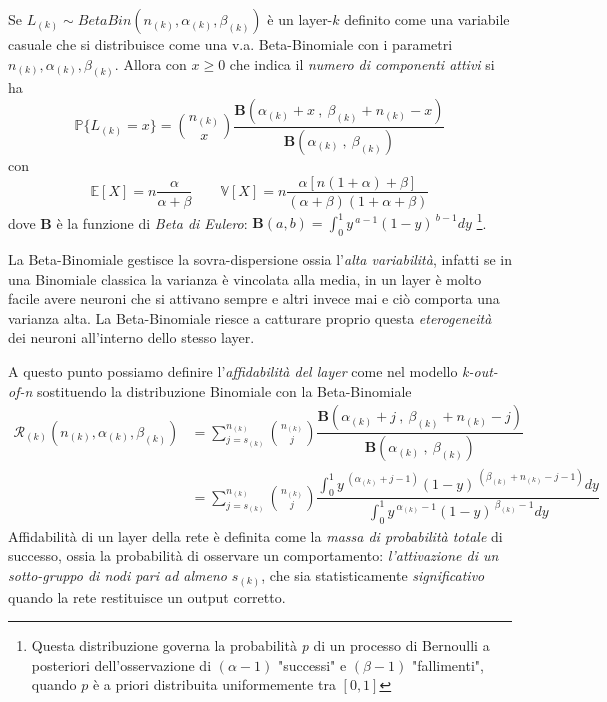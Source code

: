 \documentclass[10pt]{article} %
\begin{document}
Se $L_{(k)}\sim BetaBin(n_{(k)},\alpha_{(k)},\beta_{(k)})$ è un layer-$k$ definito come una variabile casuale che si distribuisce come una v.a. Beta-Binomiale con i parametri $n_{(k)},\alpha_{(k)},\beta_{(k)}$. Allora con $x \ge 0$ che indica il \textit{numero di componenti attivi} si ha
\begin{equation}\label{BetaBin}
    \mathbb{P}\{L_{(k)} = x\} = \binom{n_{(k)}}{x}\dfrac{\textbf{B}(\alpha_{(k)}+x\ ,\ \beta_{(k)}+n_{(k)}-x)}{\textbf{B}(\alpha_{(k)}\ ,\ \beta_{(k)})}
\end{equation}
con
\begin{equation}
    \mathbb{E}[X] = n\dfrac{\alpha}{\alpha+\beta} \qquad 
    \mathbb{V}[X] = n\dfrac{\alpha[n(1+\alpha)+\beta]}{(\alpha+\beta)(1+\alpha+\beta)}
\end{equation}
dove \textbf{B} è la funzione di \textit{Beta di Eulero}:
$\textbf{B}(a, b) = \int_{0}^{1} y^{\ a-1}(1-y)^{\ b-1} dy$ \footnote{Questa distribuzione governa la probabilità 
\textit{p} di un processo di Bernoulli a posteriori dell'osservazione di $(\alpha-1)$ "successi" e $(\beta-1)$ "fallimenti", quando $p$ è a priori distribuita uniformemente tra $[0,1]$}.

La Beta-Binomiale gestisce la sovra-dispersione ossia l'\textit{alta variabilità}, infatti se in una Binomiale classica la varianza è vincolata alla media, in un layer è molto facile avere neuroni che si attivano sempre e altri invece mai e ciò comporta una varianza alta. La Beta-Binomiale riesce a catturare proprio questa \textit{eterogeneità} dei neuroni all'interno dello stesso layer.

A questo punto possiamo definire l'\textit{affidabilità del layer} come nel modello \textit{k-out-of-n} sostituendo la distribuzione Binomiale con la Beta-Binomiale
\begin{align}\label{Affidabilità Layer}
    \mathcal{R}_{(k)}(n_{(k)},\alpha_{(k)}, \beta_{(k)}) &= \sum_{j=s_{(k)}}^{n_{(k)}} \binom{n_{(k)}}{j}\dfrac{\textbf{B}(\alpha_{(k)}+j\ ,\ \beta_{(k)}+n_{(k)}-j)}{\textbf{B}(\alpha_{(k)}\ ,\ \beta_{(k)})}\\
    &=\sum_{j=s_{(k)}}^{n_{(k)}} \binom{n_{(k)}}{j}\dfrac{\int_{0}^{1} y^{\ (\alpha_{(k)}+j-1)}(1-y)^{\ (\beta_{(k)}+n_{(k)}-j-1)} dy}{\int_{0}^{1} y^{\ \alpha_{(k)}-1}(1-y)^{\ \beta_{(k)}-1} dy}
\end{align}
Affidabilità di un layer della rete è definita come la \textit{massa di probabilità totale} di successo, ossia la probabilità di osservare un comportamento: \textit{l'attivazione di un sotto-gruppo di nodi pari ad almeno} $s_{(k)}$, che sia statisticamente \textit{significativo} quando la rete restituisce un output corretto.
\end{document}
